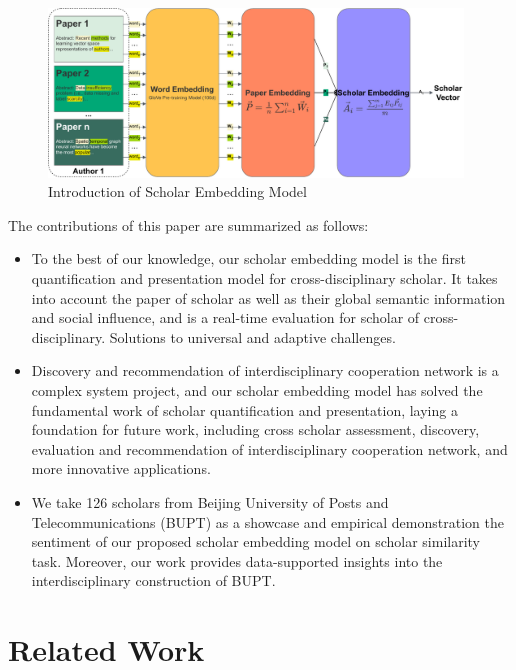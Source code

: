 \documentclass[a4paper]{jpconf}
\begin{document}
\begin{figure}[htbp] %
\centering %
\includegraphics[width=11cm]{img/intro.pdf}
\caption{Introduction of Scholar Embedding Model} %
\label{intro} %
\end{figure}

The contributions of this paper are summarized as follows:

\begin{itemize}
\item
  To the best of our knowledge, our scholar embedding model is the first
  quantification and presentation model for cross-disciplinary scholar.
  It takes into account the paper of scholar as well as their global
  semantic information and social influence, and is a real-time
  evaluation for scholar of cross-disciplinary. Solutions to universal
  and adaptive challenges.
\item
  Discovery and recommendation of interdisciplinary cooperation network
  is a complex system project, and our scholar embedding model has solved
  the fundamental work of scholar quantification and presentation, laying
  a foundation for future work, including cross scholar assessment,
  discovery, evaluation and recommendation of interdisciplinary
  cooperation network, and more innovative applications.
\item
 We take 126 scholars from Beijing University of Posts and Telecommunications (BUPT) as a showcase
  and empirical demonstration the sentiment of our
  proposed scholar embedding model on scholar similarity task. Moreover,
  our work provides data-supported insights into the interdisciplinary
  construction of BUPT.
\end{itemize}




\section{Related Work}
\end{document}
